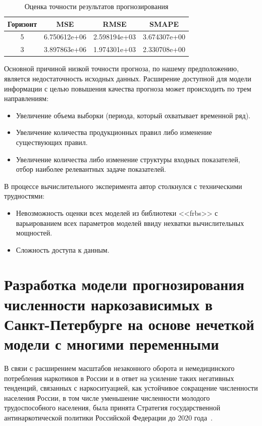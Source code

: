 \begin{table}[bhtp]
	\caption{Оценка точности результатов прогнозирования}
    \begin{tabular}{ | c | c | c | c | }
        \hline
        Горизонт & MSE & RMSE & SMAPE \\
        \hline
        5 & 6.750612e+06 & 2.598194e+03 & 3.674307e+00  \\
        \hline
        3 & 3.897863e+06 & 1.974301e+03 & 2.330708e+00  \\
        \hline
    \end{tabular}		
	\label{table:WM-error}	
\end{table}

Основной причиной низкой точности прогноза, по нашему предположению, является недостаточность исходных данных. Расширение доступной для модели информации с целью повышения качества прогноза может происходить по трем направлениям:
\begin{itemize}
	\item Увеличение объема выборки (периода, который охватывает временной ряд).
	\item Увеличение количества продукционных правил либо изменение существующих правил.
	\item Увеличение количества либо изменение структуры входных показателей, отбор наиболее релевантных задаче показателей.
\end{itemize}

В процессе вычислительного эксперимента автор столкнулся с техническими трудностями:
\begin{itemize}
	\item Невозможность оценки всех моделей из библиотеки <<frbs>> с варьированием всех параметров моделей ввиду нехватки вычислительных мощностей.
	\item Сложность доступа к данным.  
\end{itemize}
	

\section{Разработка модели прогнозирования численности наркозависимых в 
    Санкт-Петербурге на основе нечеткой модели с многими переменными}

В связи с расширением масштабов незаконного оборота и немедицинского потребления 
наркотиков  в России и в ответ на усиление таких негативных тенденций, связанных 
с наркоситуацией, как устойчивое сокращение численности населения России, в том 
числе уменьшение численности молодого трудоспособного населения, была принята 
Стратегия государственной антинаркотической политики
Российской Федерации до 2020 года~\cite{ru_nat_drug_strat}. 

